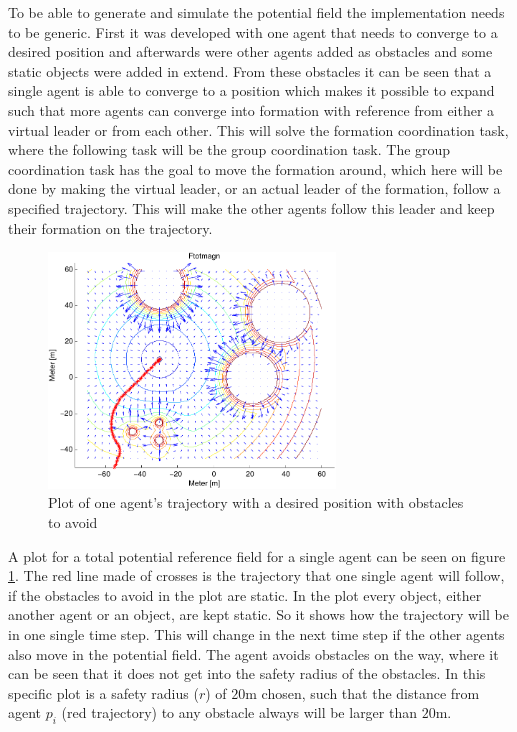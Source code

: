 \documentclass[conference]{IEEEtran}
\newcommand{\colwidth}{3in}
\begin{document}
To be able to generate and simulate the potential field the
implementation needs to be generic. First it was developed with one
agent that needs to converge to a desired position and afterwards were
other agents added as obstacles and some static objects were added in
extend. From these obstacles it can be seen that a single agent is
able to converge to a position which makes it possible to expand such
that more agents can converge into formation with reference from
either a virtual leader or from each other. This will solve the
formation coordination task, where the following task will be the
group coordination task. The group coordination task has the goal to
move the formation around, which here will be done by making the
virtual leader, or an actual leader of the formation, follow a
specified trajectory. This will make the other agents follow this
leader and keep their formation on the trajectory.

\begin{figure}[htbp]
  \includegraphics[width=\colwidth]{fig/ftotmagnfigpdf1}
	\caption{Plot of one agent's trajectory with a desired position with
		obstacles to avoid}
  \label{fig:potfieldagenti}
\end{figure}

A plot for a total potential reference field for a single agent can be
seen on figure \ref{fig:potfieldagenti}. The red line made of crosses
is the trajectory that one single agent will follow, if the obstacles
to avoid in the plot are static. In the plot every object, either
another agent or an object, are kept static. So it shows how the
trajectory will be in one single time step. This will change in the
next time step if the other agents also move in the potential field.
The agent avoids obstacles on the way, where it can be seen that it
does not get into the safety radius of the obstacles. In this specific
plot is a safety radius ($r$) of $20$m chosen, such that the distance
from agent $p_i$ (red trajectory) to any obstacle always will be
larger than $20$m.
\end{document}

